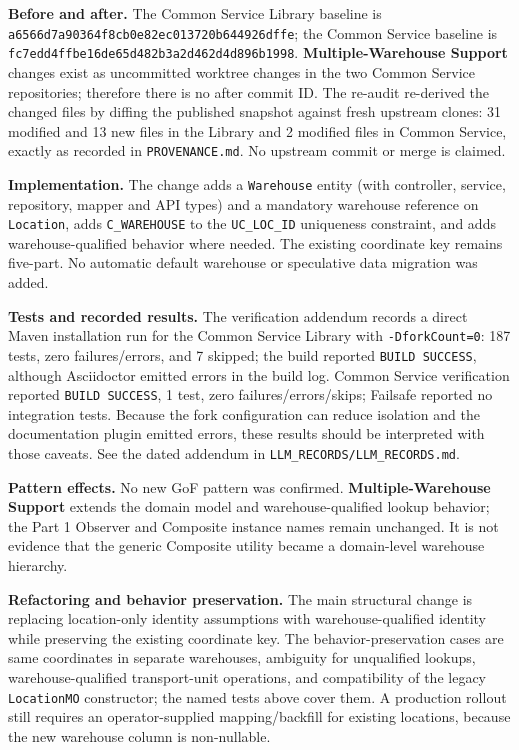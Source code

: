 \documentclass[11pt,a4paper]{article}
\newcommand{\code}[1]{\nolinkurl{#1}}
\begin{document}
\textbf{Before and after.} The Common Service Library baseline is \code{a6566d7a90364f8cb0e82ec013720b644926dffe}; the Common Service baseline is \code{fc7edd4ffbe16de65d482b3a2d462d4d896b1998}. \textbf{Multiple-Warehouse Support} changes exist as uncommitted worktree changes in the two Common Service repositories; therefore there is no after commit ID. The re-audit re-derived the changed files by diffing the published snapshot against fresh upstream clones: 31 modified and 13 new files in the Library and 2 modified files in Common Service, exactly as recorded in \code{PROVENANCE.md}. No upstream commit or merge is claimed.

\textbf{Implementation.} The change adds a \code{Warehouse} entity (with controller, service, repository, mapper and API types) and a mandatory warehouse reference on \code{Location}, adds \code{C_WAREHOUSE} to the \code{UC_LOC_ID} uniqueness constraint, and adds warehouse-qualified behavior where needed. The existing coordinate key remains five-part. No automatic default warehouse or speculative data migration was added.

\textbf{Tests and recorded results.} The verification addendum records a direct Maven installation run for the Common Service Library with \code{-DforkCount=0}: 187 tests, zero failures/errors, and 7 skipped; the build reported \texttt{BUILD SUCCESS}, although Asciidoctor emitted errors in the build log. Common Service verification reported \texttt{BUILD SUCCESS}, 1 test, zero failures/errors/skips; Failsafe reported no integration tests. Because the fork configuration can reduce isolation and the documentation plugin emitted errors, these results should be interpreted with those caveats. See the dated addendum in \code{LLM_RECORDS/LLM_RECORDS.md}.

\textbf{Pattern effects.} No new GoF pattern was confirmed. \textbf{Multiple-Warehouse Support} extends the domain model and warehouse-qualified lookup behavior; the Part 1 Observer and Composite instance names remain unchanged. It is not evidence that the generic Composite utility became a domain-level warehouse hierarchy.

\textbf{Refactoring and behavior preservation.} The main structural change is replacing location-only identity assumptions with warehouse-qualified identity while preserving the existing coordinate key. The behavior-preservation cases are same coordinates in separate warehouses, ambiguity for unqualified lookups, warehouse-qualified transport-unit operations, and compatibility of the legacy \code{LocationMO} constructor; the named tests above cover them. A production rollout still requires an operator-supplied mapping/backfill for existing locations, because the new warehouse column is non-nullable.
\end{document}
